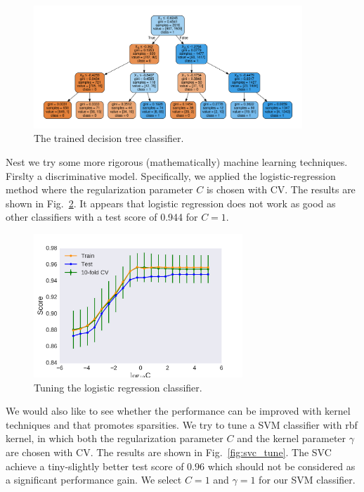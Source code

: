 \documentclass{article}
\begin{document}
\begin{figure}[h]
  \centering
  \includegraphics[width=0.9\textwidth]{figs/tree_structure.pdf}
  \caption{The trained decision tree classifier.}
  \label{fig:tree_structure}
\end{figure}

Nest we try some more rigorous (mathematically) machine learning techniques.
Firslty a discriminative model. Specifically, we applied the
logistic-regression method where the regularization parameter $C$ is chosen with
CV. The results are shown in Fig.~\ref{fig:logreg_tune}. It appears that
logistic regression does not work as good as other classifiers with a test score
of 0.944 for $C=1$.

\begin{figure}[h]
  \centering
  \includegraphics[width=0.7\textwidth]{figs/logreg_tuning.pdf}
  \caption{Tuning the logistic regression classifier.}
  \label{fig:logreg_tune}
\end{figure}

We would also like to see whether the performance can be improved with kernel
techniques and that promotes sparsities. We try to tune a SVM classifier with rbf kernel,
in which both the regularization parameter $C$ and the kernel parameter $\gamma$
are chosen with CV. The results are shown in Fig.~\ref{fig:svc_tune}. The SVC
achieve a tiny-slightly better test score of $0.96$ which should not be
considered as a significant performance gain. We select $C=1$ and $\gamma=1$ for
our SVM classifier.
\end{document}
